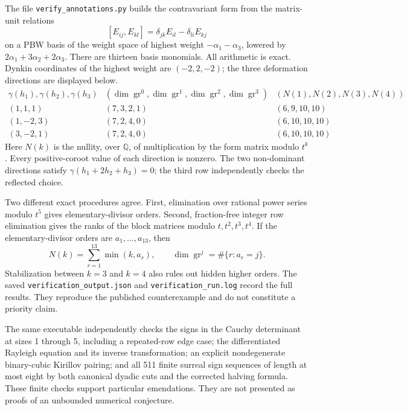 \begin{example}\oursComputed
The file \texttt{verify\_annotations.py} builds the contravariant form from the matrix-unit relations
\[
 [E_{ij},E_{kl}]=\delta_{jk}E_{il}-\delta_{li}E_{kj}
\]
on a PBW basis of the weight space of highest weight \(-\alpha_1-\alpha_3\), lowered by \(2\alpha_1+3\alpha_2+2\alpha_3\). There are thirteen basis monomials. All arithmetic is exact. Dynkin coordinates of the highest weight are \((-2,2,-2)\); the three deformation directions are displayed below.
\[
\begin{array}{c|c|c}
\gamma(h_1),\gamma(h_2),\gamma(h_3)&
(\dim \operatorname{gr}^0,\dim \operatorname{gr}^1,
 \dim \operatorname{gr}^2,\dim \operatorname{gr}^3)&
(N(1),N(2),N(3),N(4))\\\hline
(1,1,1)&(7,3,2,1)&(6,9,10,10)\\
(1,-2,3)&(7,2,4,0)&(6,10,10,10)\\
(3,-2,1)&(7,2,4,0)&(6,10,10,10)
\end{array}
\]
Here \(N(k)\) is the nullity, over \(\mathbb Q\), of multiplication by the form matrix modulo \(t^k\). Every positive-coroot value of each direction is nonzero. The two non-dominant directions satisfy \(\gamma(h_1+2h_2+h_3)=0\); the third row independently checks the reflected choice.

Two different exact procedures agree. First, elimination over rational power series modulo \(t^5\) gives elementary-divisor orders. Second, fraction-free integer row elimination gives the ranks of the block matrices modulo \(t,t^2,t^3,t^4\). If the elementary-divisor orders are \(a_1,\ldots,a_{13}\), then
\[
 N(k)=\sum_{r=1}^{13}\min(k,a_r),\qquad
 \dim\operatorname{gr}^j=\#\{r:a_r=j\}.
\]
Stabilization between \(k=3\) and \(k=4\) also rules out hidden higher orders. The saved \texttt{verification\_output.json} and \texttt{verification\_run.log} record the full results. They reproduce the published counterexample and do not constitute a priority claim.
\end{example}

The same executable independently checks the signs in the Cauchy determinant at sizes 1 through 5, including a repeated-row edge case; the differentiated Rayleigh equation and its inverse transformation; an explicit nondegenerate binary-cubic Kirillov pairing; and all 511 finite surreal sign sequences of length at most eight by both canonical dyadic cuts and the corrected halving formula. These finite checks support particular emendations. They are not presented as proofs of an unbounded numerical conjecture.

